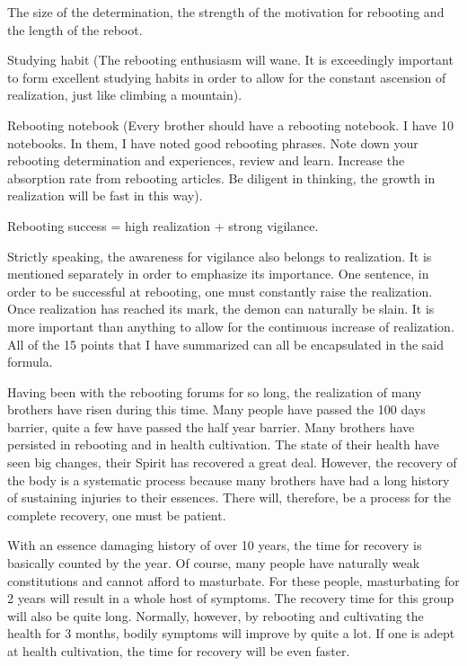 \documentclass[
]{book}
\begin{document}
The size of the determination, the strength of the motivation for rebooting and the length of the reboot.

Studying habit (The rebooting enthusiasm will wane. It is exceedingly important to form excellent studying habits in order to allow for the constant ascension of realization, just like climbing a mountain).

Rebooting notebook (Every brother should have a rebooting notebook. I have 10 notebooks. In them, I have noted good rebooting phrases. Note down your rebooting determination and experiences, review and learn. Increase the absorption rate from rebooting articles. Be diligent in thinking, the growth in realization will be fast in this way).

Rebooting success = high realization + strong vigilance.

Strictly speaking, the awareness for vigilance also belongs to realization. It is mentioned separately in order to emphasize its importance. One sentence, in order to be successful at rebooting, one must constantly raise the realization. Once realization has reached its mark, the demon can naturally be slain. It is more important than anything to allow for the continuous increase of realization. All of the 15 points that I have summarized can all be encapsulated in the said formula.

Having been with the rebooting forums for so long, the realization of many brothers have risen during this time. Many people have passed the 100 days barrier, quite a few have passed the half year barrier. Many brothers have persisted in rebooting and in health cultivation. The state of their health have seen big changes, their Spirit has recovered a great deal. However, the recovery of the body is a systematic process because many brothers have had a long history of sustaining injuries to their essences. There will, therefore, be a process for the complete recovery, one must be patient.

With an essence damaging history of over 10 years, the time for recovery is basically counted by the year. Of course, many people have naturally weak constitutions and cannot afford to masturbate. For these people, masturbating for 2 years will result in a whole host of symptoms. The recovery time for this group will also be quite long. Normally, however, by rebooting and cultivating the health for 3 months, bodily symptoms will improve by quite a lot. If one is adept at health cultivation, the time for recovery will be even faster.
\end{document}
